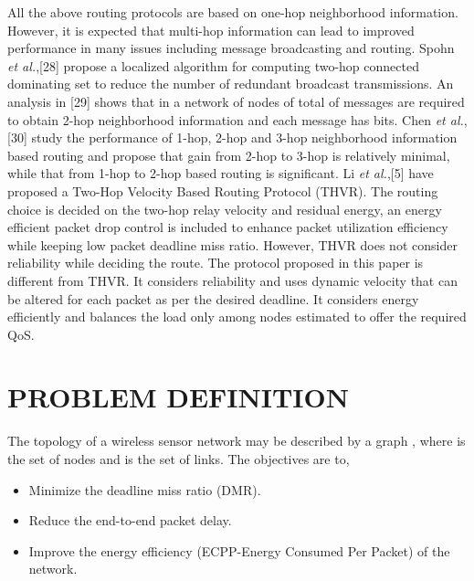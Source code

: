 \documentclass[fleqn,twoside]{article}
\begin{document}
\vskip 2mm
All the above routing protocols are based on one-hop neighborhood information. However, it is expected that multi-hop information can lead to improved performance in many issues including message broadcasting and routing. Spohn \emph{et al.},[28] propose a localized algorithm for computing two-hop connected dominating set to reduce the number of redundant broadcast transmissions. An analysis in [29] shows that in a network of  nodes of total of  messages are required to obtain 2-hop neighborhood information and each message has  bits. 
Chen \emph{et al.},[30] study the performance of 1-hop, 2-hop and 3-hop neighborhood information based
routing and propose that gain from 2-hop to 3-hop is relatively minimal, while that from 1-hop to 2-hop based routing is significant.
\vskip 2mm
Li \emph{et al.},[5] have proposed a Two-Hop Velocity Based Routing Protocol (THVR). The routing choice is decided on the two-hop relay velocity and residual energy, an energy efficient packet drop control is included to enhance packet utilization efficiency while keeping low packet deadline miss ratio. However, THVR does not consider reliability while deciding the route. The protocol proposed in this paper is different from THVR. It considers reliability and uses dynamic velocity that can be altered for each packet as per the desired deadline. It considers energy efficiently and balances the load only among nodes estimated to offer the required QoS.
 \section{PROBLEM DEFINITION}
\label{section:pd}
The topology of a wireless sensor network may be described by a graph , where  is the set of nodes and  is the set of links. The objectives are to,
\begin{itemize}
\item Minimize the deadline miss ratio (DMR).
\item Reduce the end-to-end packet delay.
\item Improve the energy efficiency (ECPP-Energy Consumed Per Packet) of the network.
\end{itemize}
\end{document}
